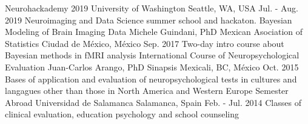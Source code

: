 \begin{cvcourses}
    \cvcourse
        {Neurohackademy 2019}
        {}
        {University of Washington}
        {Seattle, WA, USA}
        {Jul. - Aug. 2019}
        {Neuroimaging and Data Science summer school and hackaton.}
    \cvcourse
        {Bayesian Modeling of Brain Imaging Data}
        {Michele Guindani, PhD}
        {Mexican Asociation of Statistics}
        {Ciudad de México, México}
        {Sep. 2017}
        {Two-day intro course about Bayesian methods in fMRI analysis}
    \cvcourse
        {International Course of Neuropsychological Evaluation}
        {Juan-Carlos Arango, PhD}
        {Sinapsis}
        {Mexicali, BC, México}
        {Oct. 2015}
        {Bases of application and evaluation of
            neuropsychological tests in cultures and langagues other
            than those in North America and Western Europe}
    \cvcourse
        {Semester Abroad}
        {}
        {Universidad de Salamanca}
        {Salamanca, Spain}
        {Feb. - Jul. 2014}
        {Classes of clinical evaluation, education psychology and
            school counseling}
\end{cvcourses}

